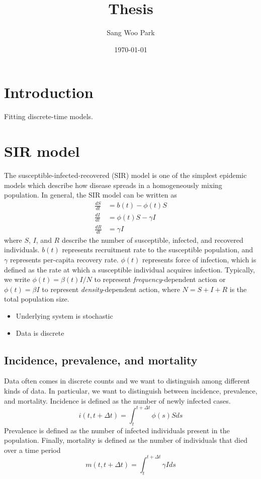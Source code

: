 \documentclass{article}
\title{Thesis}
\date{\today}
\author{Sang Woo Park}
\begin{document}
\maketitle


\section{Introduction}

Fitting discrete-time models.

\section{SIR model}

The susceptible-infected-recovered (SIR) model is one of the simplest epidemic models which describe how disease spreads in a homogeneously mixing population.
In general, the SIR model can be written as 
\begin{equation}
\begin{aligned}
\frac{dS}{dt} &= b(t) - \phi(t) S\\
\frac{dI}{dt} &= \phi(t) S - \gamma I\\
\frac{dR}{dt} &= \gamma I
\end{aligned}
\label{eq:sir}
\end{equation}
where $S$, $I$, and $R$ describe the number of susceptible, infected, and recovered individuals.
$b(t)$ represents recruitment rate to the susceptible population, and $\gamma$ represents per-capita recovery rate.
$\phi(t)$ represents force of infection, which is defined as the rate at which a susceptible individual acquires infection.
Typically, we write $\phi(t) = \beta(t) I/N$ to represent \textit{frequency}-dependent action or $\phi(t) = \beta I$ to represent \textit{density}-dependent action, where $N = S + I + R$ is the total population size.

\begin{itemize}
	\item Underlying system is stochastic
	\item Data is discrete
\end{itemize}


\subsection{Incidence, prevalence, and mortality}

Data often comes in discrete counts and we want to distinguish among different kinds of data. In particular, we want to distinguish between incidence, prevalence, and mortality.
Incidence is defined as the number of newly infected cases.
\begin{equation}
i(t, t+\Delta t) = \int_{t}^{t+\Delta t} \phi(s) S ds
\end{equation}
Prevalence is defined as the number of infected individuals present in the population.
Finally, mortality is defined as the number of individuals that died over a time period
\begin{equation}
m(t, t+\Delta t) = \int_{t}^{t+\Delta t} \gamma I ds
\end{equation}
\end{document}
